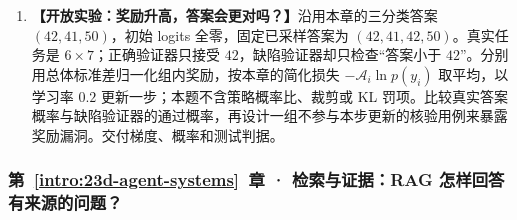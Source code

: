 \begin{enumerate}[label={},leftmargin=4.8em,itemsep=4pt]
\item[\textbf{C-100.}] \leavevmode{}\label{exercise:C-100}\label{exercise:reward-verifier-audit}\textbf{【开放实验：奖励升高，答案会更对吗？】}沿用本章的三分类答案 $(42,41,50)$，初始 logits 全零，固定已采样答案为 $(42,41,42,50)$。真实任务是 $6\times7$；正确验证器只接受 $42$，缺陷验证器却只检查“答案小于 $42$”。分别用总体标准差归一化组内奖励，按本章的简化损失 $-\mathcal A_i\ln p(y_i)$ 取平均，以学习率 $0.2$ 更新一步；本题不含策略概率比、裁剪或 KL 罚项。比较真实答案概率与缺陷验证器的通过概率，再设计一组不参与本步更新的核验用例来暴露奖励漏洞。交付梯度、概率和测试判据。
\end{enumerate}
\subsubsection*{第~\ref*{intro:23d-agent-systems}~章 · 检索与证据：RAG 怎样回答有来源的问题？}
